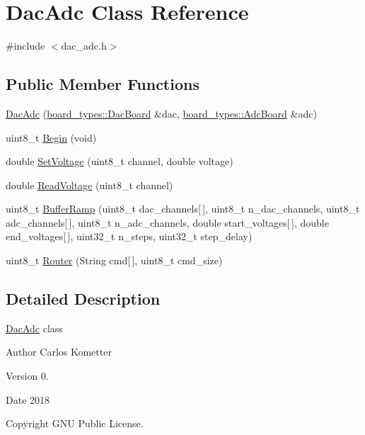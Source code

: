 \hypertarget{classDacAdc}{}\section{Dac\+Adc Class Reference}
\label{classDacAdc}


{\ttfamily \#include $<$dac\+\_\+adc.\+h$>$}

\subsection*{Public Member Functions}
\begin{DoxyCompactItemize}
\item 
\mbox{\hyperlink{classDacAdc_a44566ccabc0c62f8e1236ab3e0d3a7d3}{Dac\+Adc}} (\mbox{\hyperlink{classboard__types_1_1DacBoard}{board\+\_\+types\+::\+Dac\+Board}} \&dac, \mbox{\hyperlink{classboard__types_1_1AdcBoard}{board\+\_\+types\+::\+Adc\+Board}} \&adc)
\item 
uint8\+\_\+t \mbox{\hyperlink{classDacAdc_a47ca1d0dbf523906fe32363599772066}{Begin}} (void)
\item 
double \mbox{\hyperlink{classDacAdc_a767f1e29f9688c1b2292fbfbef8c4622}{Set\+Voltage}} (uint8\+\_\+t channel, double voltage)
\item 
double \mbox{\hyperlink{classDacAdc_a5238dc258e8312e4c28161b2fad77249}{Read\+Voltage}} (uint8\+\_\+t channel)
\item 
uint8\+\_\+t \mbox{\hyperlink{classDacAdc_a4d2b0df392722734dbac322b1d0fa08d}{Buffer\+Ramp}} (uint8\+\_\+t dac\+\_\+channels\mbox{[}$\,$\mbox{]}, uint8\+\_\+t n\+\_\+dac\+\_\+channels, uint8\+\_\+t adc\+\_\+channels\mbox{[}$\,$\mbox{]}, uint8\+\_\+t n\+\_\+adc\+\_\+channels, double start\+\_\+voltages\mbox{[}$\,$\mbox{]}, double end\+\_\+voltages\mbox{[}$\,$\mbox{]}, uint32\+\_\+t n\+\_\+steps, uint32\+\_\+t step\+\_\+delay)
\item 
uint8\+\_\+t \mbox{\hyperlink{classDacAdc_af88ff87151dd01c8aa2646a84e26e7aa}{Router}} (String cmd\mbox{[}$\,$\mbox{]}, uint8\+\_\+t cmd\+\_\+size)
\end{DoxyCompactItemize}


\subsection{Detailed Description}
\mbox{\hyperlink{classDacAdc}{Dac\+Adc}} class \begin{DoxyAuthor}{Author}
Carlos Kometter 
\end{DoxyAuthor}
\begin{DoxyVersion}{Version}
0. 
\end{DoxyVersion}
\begin{DoxyDate}{Date}
2018 
\end{DoxyDate}
\begin{DoxyCopyright}{Copyright}
G\+NU Public License. 
\end{DoxyCopyright}


